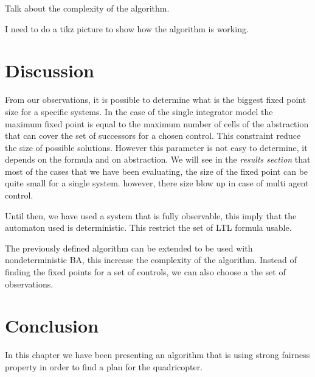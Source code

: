 Talk about the complexity of the algorithm.

I need to do a tikz picture to show how the algorithm is working.

\section{Discussion}
From our observations, it is possible to determine what is the biggest fixed point size for a specific systems.
In the case of the single integrator model the maximum fixed point is equal to the maximum number of cells of the abstraction that can cover the set of successors for a chosen control.
This constraint reduce the size of possible solutions.
However this parameter is not easy to determine, it depends on the formula and on abstraction.
We will see in the \textit{results section} that most of the cases that we have been evaluating, the size of the fixed point can be quite small for a single system. however, there size blow up in case of multi agent control.

Until then, we have used a system that is fully observable, this imply that the \buchi{} automaton used is deterministic.
This restrict the set of LTL formula usable. 

The previously defined algorithm can be extended to be used with nondeterministic BA, this increase the complexity of the algorithm. 
Instead of finding the fixed points for a set of controls, we can also choose a the set of observations.


\section{Conclusion}
In this chapter we have been presenting an algorithm that is using strong fairness property in order to find a plan for the quadricopter.
